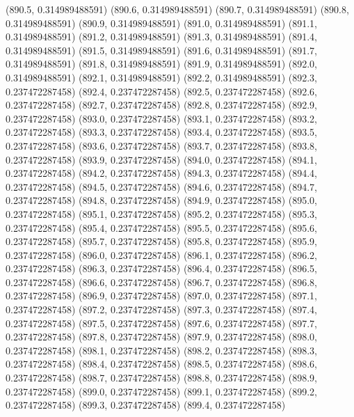 {					(890.5, 0.314989488591)
					(890.6, 0.314989488591)
					(890.7, 0.314989488591)
					(890.8, 0.314989488591)
					(890.9, 0.314989488591)
					(891.0, 0.314989488591)
					(891.1, 0.314989488591)
					(891.2, 0.314989488591)
					(891.3, 0.314989488591)
					(891.4, 0.314989488591)
					(891.5, 0.314989488591)
					(891.6, 0.314989488591)
					(891.7, 0.314989488591)
					(891.8, 0.314989488591)
					(891.9, 0.314989488591)
					(892.0, 0.314989488591)
					(892.1, 0.314989488591)
					(892.2, 0.314989488591)
					(892.3, 0.237472287458)
					(892.4, 0.237472287458)
					(892.5, 0.237472287458)
					(892.6, 0.237472287458)
					(892.7, 0.237472287458)
					(892.8, 0.237472287458)
					(892.9, 0.237472287458)
					(893.0, 0.237472287458)
					(893.1, 0.237472287458)
					(893.2, 0.237472287458)
					(893.3, 0.237472287458)
					(893.4, 0.237472287458)
					(893.5, 0.237472287458)
					(893.6, 0.237472287458)
					(893.7, 0.237472287458)
					(893.8, 0.237472287458)
					(893.9, 0.237472287458)
					(894.0, 0.237472287458)
					(894.1, 0.237472287458)
					(894.2, 0.237472287458)
					(894.3, 0.237472287458)
					(894.4, 0.237472287458)
					(894.5, 0.237472287458)
					(894.6, 0.237472287458)
					(894.7, 0.237472287458)
					(894.8, 0.237472287458)
					(894.9, 0.237472287458)
					(895.0, 0.237472287458)
					(895.1, 0.237472287458)
					(895.2, 0.237472287458)
					(895.3, 0.237472287458)
					(895.4, 0.237472287458)
					(895.5, 0.237472287458)
					(895.6, 0.237472287458)
					(895.7, 0.237472287458)
					(895.8, 0.237472287458)
					(895.9, 0.237472287458)
					(896.0, 0.237472287458)
					(896.1, 0.237472287458)
					(896.2, 0.237472287458)
					(896.3, 0.237472287458)
					(896.4, 0.237472287458)
					(896.5, 0.237472287458)
					(896.6, 0.237472287458)
					(896.7, 0.237472287458)
					(896.8, 0.237472287458)
					(896.9, 0.237472287458)
					(897.0, 0.237472287458)
					(897.1, 0.237472287458)
					(897.2, 0.237472287458)
					(897.3, 0.237472287458)
					(897.4, 0.237472287458)
					(897.5, 0.237472287458)
					(897.6, 0.237472287458)
					(897.7, 0.237472287458)
					(897.8, 0.237472287458)
					(897.9, 0.237472287458)
					(898.0, 0.237472287458)
					(898.1, 0.237472287458)
					(898.2, 0.237472287458)
					(898.3, 0.237472287458)
					(898.4, 0.237472287458)
					(898.5, 0.237472287458)
					(898.6, 0.237472287458)
					(898.7, 0.237472287458)
					(898.8, 0.237472287458)
					(898.9, 0.237472287458)
					(899.0, 0.237472287458)
					(899.1, 0.237472287458)
					(899.2, 0.237472287458)
					(899.3, 0.237472287458)
					(899.4, 0.237472287458)
}
